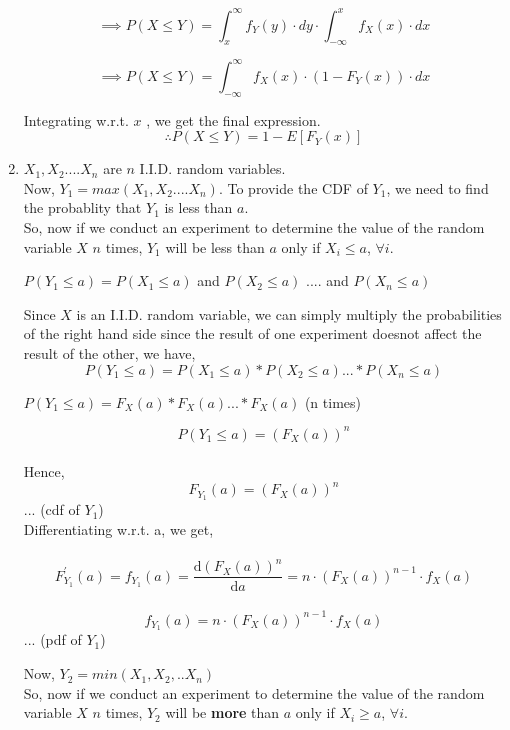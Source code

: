 \documentclass[11pt]{article}
\begin{document}
\begin{enumerate}
{		$$ \implies P(X \leq Y) = \int_{x}^{\infty}{f_Y(y)\cdot dy}\cdot \int_{-\infty}^{x}{f_X(x)\cdot dx} $$

		$$ \implies P(X \leq Y) = \int_{-\infty}^{\infty}{f_X(x)\cdot(1-F_Y(x))\cdot dx} $$

		Integrating w.r.t. $x$ , we get the final expression.
		$$ \therefore P(X \leq Y) = 1 - E[F_Y(x)] $$

	}

	\item{
		$X_1, X_2 .... X_n$ are $n$ I.I.D. random variables. \\
		Now, $Y_1 = max(X_1, X_2 .... X_n) $. To provide the CDF of $Y_1$, we need to find the probablity that $Y_1$ is less than $a$. \\

		So, now if we conduct an experiment to determine the value of the random variable $X$ $n$ times, $Y_1$ will be less than $a$ only if $X_i \leq a$, $ \forall{i} $. \\

		\begin{center}
			$P(Y_1 \leq a) = P(X_1 \leq a) $ and $ P(X_2 \leq a)$ .... and $P(X_n \leq a)$
		\end{center}
		Since $X$ is an I.I.D. random variable, we can simply multiply the probabilities of the right hand side since the result of one experiment doesnot affect the result of the other, we have, \\
		$$P(Y_1 \leq a) = P(X_1 \leq a)*P(X_2 \leq a) ... *P(X_n \leq a)$$
		\begin{center}
			$P(Y_1 \leq a) = F_X{(a)}*F_X{(a)} ... *F_X{(a)}$  (n times) \\
		\end{center}
		$$P(Y_1 \leq a) = {(F_X(a))}^n$$
		\\
		Hence, $$F_{Y_1}(a) = (F_{X}(a))^n$$	\hfill{... (cdf of $Y_1$)} \\
		Differentiating w.r.t. a, we get, \\ \\
		$$F^{'}_{Y_1}(a) = f_{Y_1}(a) = \frac{\mathrm{d}(F_{X}(a))^n }{\mathrm{d} a}  = n\cdot (F_{X}(a))^{n-1}\cdot f_X(a)$$\\
		$$f_{Y_1}(a) = n\cdot (F_{X}(a))^{n-1}\cdot f_X(a)$$ \hfill{... (pdf of $Y_1$)} 

		Now, $Y_2 = min(X_1,X_2,..X_n)$ \\

		So, now if we conduct an experiment to determine the value of the random variable $X$ $n$ times, $Y_2$ will be \textbf{more} than $a$ only if $X_i \geq a$, $ \forall{i} $. \\ \\

}
\end{enumerate}
\end{document}
